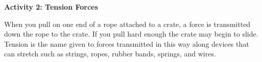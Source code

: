 \pagebreak
\textbf{Activity 2: Tension Forces}

When you pull on one end of a rope attached to a crate, a force is transmitted
down the rope to the crate. If you pull hard enough the crate may begin to slide.
Tension is the name given to forces transmitted in this way along devices that
can stretch such as strings, ropes, rubber bands, springs, and wires.









